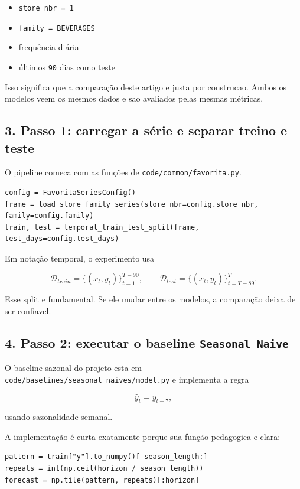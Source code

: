 \documentclass[12pt]{article}
\providecommand{\tightlist}{%
          \setlength{\itemsep}{0pt}\setlength{\parskip}{0pt}}
\begin{document}
\begin{itemize}
\tightlist
\item
  \texttt{store\_nbr\ =\ 1}
\item
  \texttt{family\ =\ BEVERAGES}
\item
  frequência diária
\item
  últimos \texttt{90} dias como teste
\end{itemize}

Isso significa que a comparação deste artigo e justa por construcao. Ambos os modelos veem os mesmos dados e sao avaliados pelas mesmas métricas.

\subsection{3. Passo 1: carregar a série e separar treino e teste}\label{3-passo-1-carregar-a-suxe9rie-e-separar-treino-e-teste}

O pipeline comeca com as funções de \texttt{code/common/favorita.py}.

\begin{verbatim}
config = FavoritaSeriesConfig()
frame = load_store_family_series(store_nbr=config.store_nbr, family=config.family)
train, test = temporal_train_test_split(frame, test_days=config.test_days)
\end{verbatim}

Em notação temporal, o experimento usa

\[
\mathcal{D}_{train} = \{(x_t, y_t)\}_{t=1}^{T-90},
\qquad
\mathcal{D}_{test} = \{(x_t, y_t)\}_{t=T-89}^T.
\]

Esse split e fundamental. Se ele mudar entre os modelos, a comparação deixa de ser confiavel.

\subsection{\texorpdfstring{4. Passo 2: executar o baseline \texttt{Seasonal\ Naive}}{4. Passo 2: executar o baseline Seasonal Naive}}\label{4-passo-2-executar-o-baseline-seasonal-naive}

O baseline sazonal do projeto esta em \texttt{code/baselines/seasonal\_naives/model.py} e implementa a regra

\[
\hat{y}_t = y_{t-7},
\]

usando sazonalidade semanal.

A implementação é curta exatamente porque sua função pedagogica e clara:

\begin{verbatim}
pattern = train["y"].to_numpy()[-season_length:]
repeats = int(np.ceil(horizon / season_length))
forecast = np.tile(pattern, repeats)[:horizon]
\end{verbatim}
\end{document}
